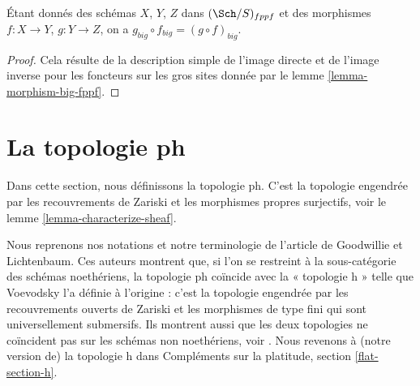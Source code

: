 \begin{lemma}
\label{lemma-composition-fppf}
Étant donnés des schémas $X$, $Y$, $Z$ dans $(\Sch/S)_{fppf}$
et des morphismes $f : X \to Y$, $g : Y \to Z$, on a
$g_{big} \circ f_{big} = (g \circ f)_{big}$.
\end{lemma}

\begin{proof}
Cela résulte de la description simple de l'image directe
et de l'image inverse pour les foncteurs sur les gros sites donnée par le
lemme \ref{lemma-morphism-big-fppf}.
\end{proof}



















































\section{La topologie ph}
\label{section-ph}

\noindent
Dans cette section, nous définissons la topologie ph. C'est la topologie
engendrée par les recouvrements de Zariski et les morphismes propres surjectifs, voir
le lemme \ref{lemma-characterize-sheaf}.

\medskip\noindent
Nous reprenons nos notations et notre terminologie
de l'article \cite{ph} de Goodwillie et Lichtenbaum.
Ces auteurs montrent que, si l'on se restreint à la sous-catégorie des
schémas noethériens, la topologie ph coïncide avec la
« topologie h » telle que Voevodsky l'a définie à l'origine : c'est
la topologie engendrée par les recouvrements ouverts de Zariski et les
morphismes de type fini qui sont universellement submersifs.
Ils montrent aussi que les deux topologies ne coïncident pas sur les
schémas non noethériens, voir \cite[exemple 4.5]{ph}.
Nous revenons à (notre version de) la topologie h dans
Compléments sur la platitude, section \ref{flat-section-h}.

